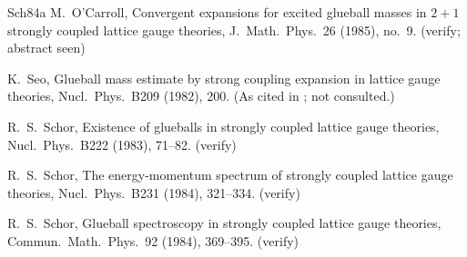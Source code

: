 \documentclass[11pt,a4paper]{article}
\theoremstyle{definition}
\theoremstyle{remark}
\begin{document}
\begin{thebibliography}{Sch84a}
M.~O'Carroll, Convergent expansions for excited glueball masses in $2+1$ strongly coupled lattice gauge theories,
J.\ Math.\ Phys.\ 26 (1985), no.~9. (verify; abstract seen)

K.~Seo, Glueball mass estimate by strong coupling expansion in lattice gauge theories, Nucl.\ Phys.\ B209 (1982), 200. (As cited in \cite{LMP07};
not consulted.)

R.~S.~Schor, Existence of glueballs in strongly coupled lattice gauge theories, Nucl.\ Phys.\ B222 (1983), 71--82. (verify)

R.~S.~Schor, The energy-momentum spectrum of strongly coupled lattice gauge theories, Nucl.\ Phys.\ B231 (1984), 321--334. (verify)

R.~S.~Schor, Glueball spectroscopy in strongly coupled lattice gauge theories, Commun.\ Math.\ Phys.\ 92 (1984), 369--395. (verify)

\end{thebibliography}
\end{document}
